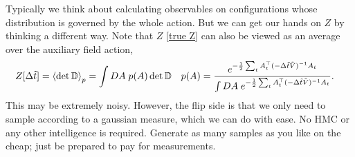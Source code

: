 Typically we think about calculating observables on configurations whose distribution is governed by the whole action.
But we can get our hands on $Z$ by thinking a different way.
Note that $Z$ \eqref{true Z} can also be viewed as an average over the auxiliary field action,
\begin{align}
	Z[\Delta\tilde{t}]
	&= \left\langle  \det{\ensuremath{\mathbb{D}}}  \right\rangle_{p} = \int DA\; p(A) \det{\ensuremath{\mathbb{D}}}
	&
	p(A) &= \frac{
		e^{-\frac{1}{2} \sum_t A{}^{\top}_t (-\Delta\tilde{t} \tilde{V})^{-1} A_t}
	}{
		\int DA\; e^{-\frac{1}{2} \sum_t A{}^{\top}_t (-\Delta\tilde{t} \tilde{V})^{-1} A_t}
	}.
\end{align}
This may be extremely noisy.
However, the flip side is that we only need to sample according to a gaussian measure, which we can do with ease.
No HMC or any other intelligence is required.
Generate as many samples as you like on the cheap; just be prepared to pay for measurements.
